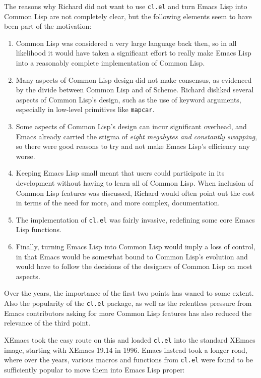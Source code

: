 \documentclass[format=acmsmall, review]{acmart}
\newcommand \Elisp {Emacs Lisp}
\begin{document}
The reasons why Richard did not want to use \texttt{cl.el} and turn \Elisp{}
into Common Lisp are not completely clear, but the following elements seem
to have been part of the motivation:
\begin{enumerate}
\item Common Lisp was considered a very large language back then, so in all
  likelihood it would have taken a significant effort to really make
  \Elisp{} into a reasonably complete implementation of Common Lisp.
\item Many aspects of Common Lisp design did not make consensus, as
  evidenced by the divide between Common Lisp and of Scheme.
  Richard disliked several aspects of Common Lisp's design, such as the use of
  keyword arguments, especially in low-level primitives like
  \texttt{mapcar}.
\item Some aspects of Common Lisp's design can incur 
  significant overhead, and Emacs already carried the stigma of \emph{eight megabytes and
    constantly swapping}, so there were good reasons to try and not make
  \Elisp{}'s efficiency any worse.
\item Keeping \Elisp{} small meant that users could participate in its
  development without having to learn all of Common Lisp.  When inclusion of
  Common Lisp features was discussed, Richard would often point out the cost
  in terms of the need for more, and more complex, documentation.
\item The implementation of \texttt{cl.el} was fairly invasive, redefining
  some core \Elisp{} functions.
\item Finally, turning \Elisp{} into Common Lisp would imply a loss of control,
  in that Emacs would be somewhat bound to Common Lisp's evolution and would
  have to follow the decisions of the designers of Common Lisp on most aspects.
\end{enumerate}
Over the years, the importance of the first two points has waned to some
extent.  Also the popularity of the \texttt{cl.el} package, as well as the
relentless pressure from Emacs contributors asking for more Common Lisp
features has also reduced the relevance of the third point.

XEmacs took the easy route on this and loaded \texttt{cl.el} into the
standard XEmacs image, starting with XEmacs 19.14 in 1996.  Emacs instead
took a longer road, where over the years, various macros and functions from
\texttt{cl.el} were found to be sufficiently popular to move them into
\Elisp{} proper:
\end{document}
